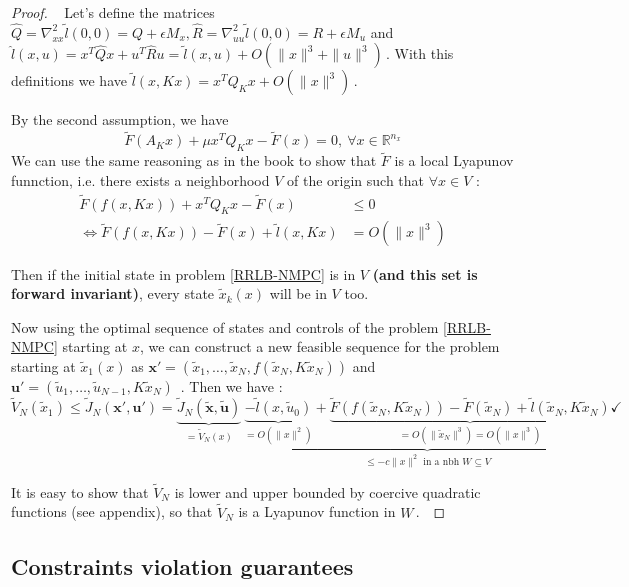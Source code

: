 \documentclass[12pt]{article}
\theoremstyle{definition}
\theoremstyle{remark}
\newcommand{\R}{\mathbb{R}}
\begin{document}
\begin{proof}~
	Let's define the matrices $\hat{Q}=\nabla_{xx}^2\tilde{l}(0,0)=Q+\epsilon M_x,\hat{R}=\nabla_{uu}^2\tilde{l}(0,0)=R+\epsilon M_u$ and $\hat{l}(x,u)=x^T\hat{Q}x+u^T\hat{R}u=\tilde{l}(x,u)+O(\|x\|^3+\|u\|^3)$\,.
	With this definitions we have $\tilde{l}(x,Kx)=x^TQ_Kx+O(\|x\|^3)$\,.

	By the second assumption, we have 
	$$\tilde{F}(A_Kx)+\mu x^T Q_K x-\tilde{F}(x)=0,~\forall x\in\R^{n_x}$$
	We can use the same reasoning as in the book to show that $\tilde{F}$ is a local Lyapunov funnction, i.e. there exists a neighborhood $V$ of the origin such that $\forall x\in V$ :
	\begin{align*}
		\tilde{F}(f(x,Kx))+x^T Q_K x-\tilde{F}(x)&\leq 0\\
		\Longleftrightarrow\tilde{F}(f(x,Kx))-\tilde{F}(x)+\tilde{l}(x,Kx)&= O(\|x\|^3)
	\end{align*}

	Then if the initial state in problem \ref{RRLB-NMPC} is in $V$ \textbf{(and this set is forward invariant)}, every state $\tilde{x}_k(x)$ will be in $V$ too.
	
	Now using the optimal sequence of states and controls of the problem \ref{RRLB-NMPC} starting at $x$, we can construct a new feasible sequence for the problem starting at $\tilde{x}_1(x)$ as 
	$\mathbf{x}'=(\tilde{x}_1,\dots,\tilde{x}_N,f(\tilde{x}_N,K\tilde{x}_N))$ and $\mathbf{u}'=(\tilde{u}_1,\dots,\tilde{u}_{N-1},K\tilde{x}_N)$ \,.
	Then we have :
	$$\tilde{V}_N(\tilde{x}_1)\leq\tilde{J}_N(\mathbf{x}',\mathbf{u}')=\underbrace{\tilde{J}_N(\tilde{\mathbf{x}},\tilde{\mathbf{u}})}_{=\tilde{V}_N(x)}~\underbrace{\underbrace{-\tilde{l}(x,\tilde{u}_0)}_{=O(\|x\|^2)}+\underbrace{\tilde{F}(f(\tilde{x}_N,K\tilde{x}_N))-\tilde{F}(\tilde{x}_N)+\tilde{l}(\tilde{x}_N,K\tilde{x}_N) }_{=O(\|\tilde{x}_N\|^3)=O(\|x\|^3)} }_{\leq-c\|x\|^2\text{ in a nbh }W\subseteq V}\checkmark$$
	
	It is easy to show that $\tilde{V}_N$ is lower and upper bounded by coercive quadratic functions (see appendix), so that $\tilde{V}_N$ is a Lyapunov function in $W$\,.~\checkmark

\end{proof}

\subsection{Constraints violation guarantees}
\end{document}
